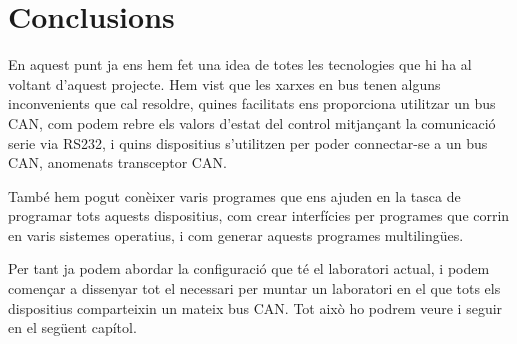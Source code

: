 
\FloatBarrier

\section{Conclusions}\label{cap:tec:conc}

En aquest punt ja ens hem fet una idea de totes les tecnologies que hi ha al voltant d'aquest projecte. Hem vist que les xarxes en bus tenen alguns inconvenients que cal resoldre, quines facilitats ens proporciona utilitzar un bus CAN, com podem rebre els valors d'estat del control mitjançant la comunicació serie via RS232, i quins dispositius s'utilitzen per poder connectar-se a un bus CAN, anomenats transceptor CAN.

També hem pogut conèixer varis programes que ens ajuden en la tasca de programar tots aquests dispositius, com crear interfícies per programes que corrin en varis sistemes operatius, i com generar aquests programes multilingües.

Per tant ja podem abordar la configuració que té el laboratori actual, i podem començar a dissenyar tot el necessari per muntar un laboratori en el que tots els dispositius comparteixin un mateix bus CAN. Tot això ho podrem veure i seguir en el següent capítol.
